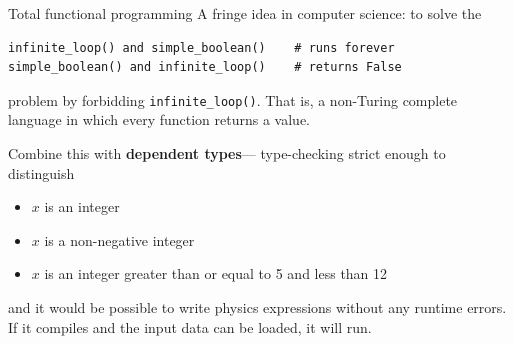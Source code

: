 \documentclass[aspectratio=169]{beamer}
\begin{document}
\begin{frame}[fragile]{Total functional programming}
\vspace{0.5 cm}
A fringe idea in computer science: to solve the

\small
\begin{center}
\begin{minipage}{0.8\linewidth}
\begin{verbatim}
infinite_loop() and simple_boolean()    # runs forever
simple_boolean() and infinite_loop()    # returns False
\end{verbatim}
\end{minipage}
\end{center}

\normalsize
problem by forbidding \texttt{infinite_loop()}. That is, a non-Turing complete language in which every function returns a value.

\vspace{0.5 cm}
Combine this with {\bf dependent types}--- type-checking strict enough to distinguish
\begin{itemize}
\item $x$ is an integer
\item $x$ is a non-negative integer
\item $x$ is an integer greater than or equal to 5 and less than 12
\end{itemize}

and it would be possible to write physics expressions without any runtime errors. If it compiles and the input data can be loaded, it will run.
\end{frame}

\begin{frame}{}

\end{frame}
\end{document}
